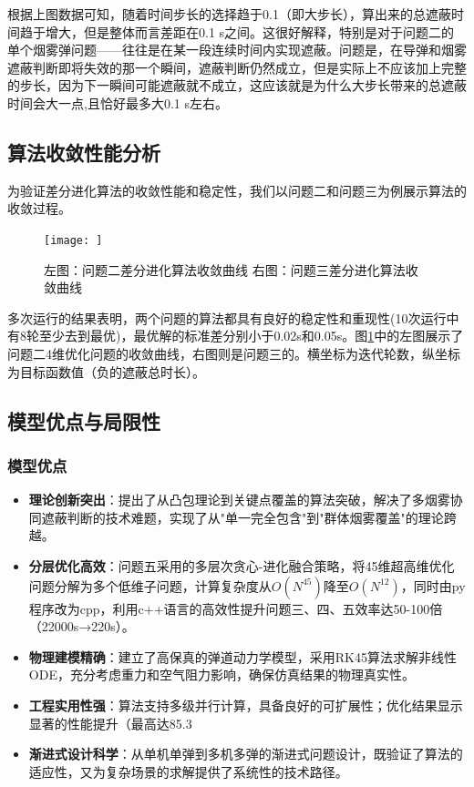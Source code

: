 \documentclass[fontset=SimSun]{ctexart}
\begin{document}
根据上图数据可知，随着时间步长的选择趋于0.1（即大步长），算出来的总遮蔽时间趋于增大，但是整体而言差距在0.1 s之间。这很好解释，特别是对于问题二的单个烟雾弹问题——往往是在某一段连续时间内实现遮蔽。问题是，在导弹和烟雾遮蔽判断即将失效的那一个瞬间，遮蔽判断仍然成立，但是实际上不应该加上完整的步长，因为下一瞬间可能遮蔽就不成立，这应该就是为什么大步长带来的总遮蔽时间会大一点,且恰好最多大0.1 s左右。

\subsection{算法收敛性能分析}

为验证差分进化算法的收敛性能和稳定性，我们以问题二和问题三为例展示算法的收敛过程。

\begin{figure}[H]
    \centering
    \texttt{[image: ]}
    \caption{左图：问题二差分进化算法收敛曲线  右图：问题三差分进化算法收敛曲线}
    \label{fig:convergence_p2}
\end{figure}

多次运行的结果表明，两个问题的算法都具有良好的稳定性和重现性(10次运行中有8轮至少去到最优)，最优解的标准差分别小于0.02s和0.05s。图\ref{fig:convergence_p2}中的左图展示了问题二4维优化问题的收敛曲线，右图则是问题三的。横坐标为迭代轮数，纵坐标为目标函数值（负的遮蔽总时长）。

\subsection{模型优点与局限性}

\subsubsection{模型优点}

\begin{itemize}[leftmargin=2.5cm]
    \item \textbf{理论创新突出}：提出了从凸包理论到关键点覆盖的算法突破，解决了多烟雾协同遮蔽判断的技术难题，实现了从"单一完全包含"到"群体烟雾覆盖"的理论跨越。
    
    \item \textbf{分层优化高效}：问题五采用的多层次贪心-进化融合策略，将45维超高维优化问题分解为多个低维子问题，计算复杂度从$O(N^{45})$降至$O(N^{12})$，同时由py程序改为cpp，利用c++语言的高效性提升问题三、四、五效率达50-100倍（22000s→220s）。
    
    \item \textbf{物理建模精确}：建立了高保真的弹道动力学模型，采用RK45算法求解非线性ODE，充分考虑重力和空气阻力影响，确保仿真结果的物理真实性。
    
    \item \textbf{工程实用性强}：算法支持多级并行计算，具备良好的可扩展性；优化结果显示显著的性能提升（最高达85.3%
    
    \item \textbf{渐进式设计科学}：从单机单弹到多机多弹的渐进式问题设计，既验证了算法的适应性，又为复杂场景的求解提供了系统性的技术路径。
\end{itemize}
\end{document}
